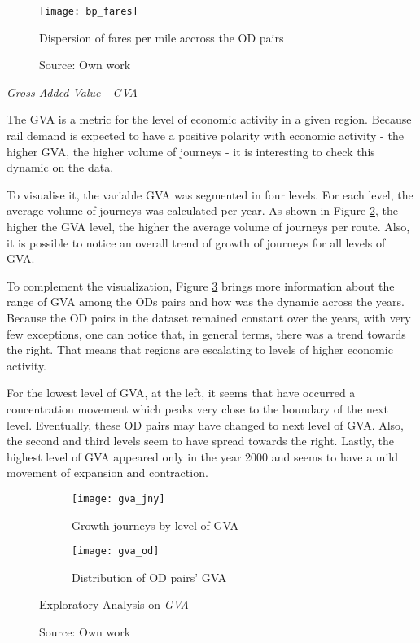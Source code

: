 \begin{figure}[H]
\centering
\texttt{[image: bp\_fares]}
\caption{Dispersion of fares per mile accross the OD pairs}
\label{fig:bp_fares}
\caption*{Source: Own work}
\end{figure} 

\textit{Gross Added Value - GVA}

The GVA is a metric for the level of economic activity in a given region. Because rail demand is expected to have a positive polarity with economic activity \citep{pdfh} - the higher GVA, the higher volume of journeys - it is interesting to check this dynamic on the data.

To visualise it, the variable GVA was segmented in four levels. For each level, the average volume of journeys was calculated per year. As shown in Figure \ref{fig:gva_jny}, the higher the GVA level, the higher the average volume of journeys per route. Also, it is possible to notice an overall trend of growth of journeys for all levels of GVA. 

To complement the visualization, Figure \ref{fig:gva_od} brings more information about the range of GVA among the ODs pairs and how was the dynamic across the years. Because the OD pairs in the dataset remained constant over the years, with very few exceptions, one can notice that, in general terms, there was a trend towards the right. That means that regions are escalating to levels of higher economic activity. 

For the lowest level of GVA, at the left, it seems that have occurred a concentration movement which peaks very close to the boundary of the next level. Eventually, these OD pairs may have changed to next level of GVA. Also, the second and third levels seem to have spread towards the right. Lastly, the highest level of GVA appeared only in the year 2000 and seems to have a mild movement of expansion and contraction.

\begin{figure}[H]
\centering
\begin{subfigure}{.5\textwidth}
  \centering
  \texttt{[image: gva\_jny]}
  \caption{Growth journeys by level of GVA}
  \label{fig:gva_jny}
\end{subfigure}%
\begin{subfigure}{.5\textwidth}
  \centering
  \texttt{[image: gva\_od]}
  \caption{Distribution of OD pairs' GVA}
  \label{fig:gva_od}
\end{subfigure}%
\caption{Exploratory Analysis on \textit{GVA}}
\label{fig:gva}
\caption*{Source: Own work}
\end{figure}

